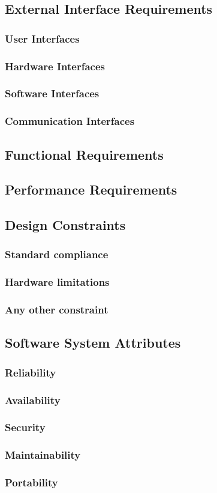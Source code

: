 \subsection{External Interface Requirements}
	\subsubsection{User Interfaces}
	\subsubsection{Hardware Interfaces}
	\subsubsection{Software Interfaces}
	\subsubsection{Communication Interfaces}
\subsection{Functional Requirements}
\subsection{Performance Requirements}
\subsection{Design Constraints}
	\subsubsection{Standard compliance}
	\subsubsection{Hardware limitations}
	\subsubsection{Any other constraint}
\subsection{Software System Attributes}
	\subsubsection{Reliability}
	\subsubsection{Availability}
	\subsubsection{Security}
	\subsubsection{Maintainability}
	\subsubsection{Portability}